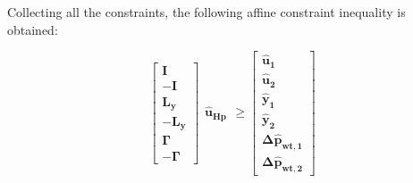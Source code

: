 Collecting all the constraints, the following affine constraint inequality is obtained:

\begin{equation}
	\begin{bmatrix}
		\bm{I} 	\\
		-\bm{I} 	\\
		\bm{L_{y}}	\\
		-\bm{L_{y}}	\\
		\bm{\Gamma}	\\
		-\bm{\Gamma}
	\end{bmatrix}
	\begin{matrix}
			\bm{\hat{u}_{Hp}}
	\end{matrix}
	\geq 
	\begin{bmatrix}
			\bm{\hat{u}_{1}}	\\
			\bm{\hat{u}_{2}}	\\
			\bm{\hat{y}_{1}}	\\
			\bm{\hat{y}_{2}}	\\
			\bm{\Delta \hat{p}_{wt,1}}	\\
			\bm{\Delta \hat{p}_{wt,2}}	
	\end{bmatrix}
\end{equation}






